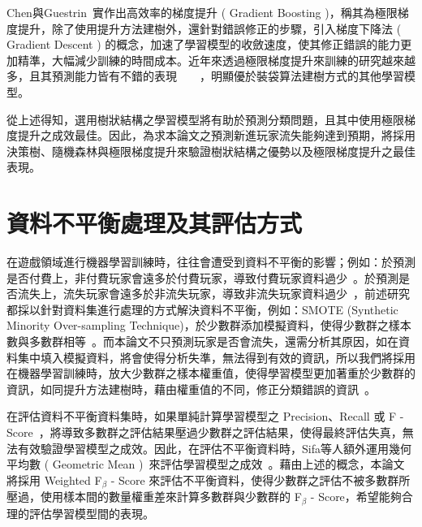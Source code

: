 Chen與Guestrin~\cite{chen2016xgboost}實作出高效率的梯度提升 ( Gradient Boosting )，稱其為極限梯度提升，除了使用提升方法建樹外，還針對錯誤修正的步驟，引入梯度下降法 ( Gradient Descent ) 的概念，加速了學習模型的收斂速度，使其修正錯誤的能力更加精準，大幅減少訓練的時間成本。近年來透過極限梯度提升來訓練的研究越來越多，且其預測能力皆有不錯的表現~\cite{XGBoostTemporalData}~\cite{martinez2020machine}~\cite{semenov2016performance}~\cite{janusz2017helping}，明顯優於裝袋算法建樹方式的其他學習模型。

從上述得知，選用樹狀結構之學習模型將有助於預測分類問題，且其中使用極限梯度提升之成效最佳。因此，為求本論文之預測新進玩家流失能夠達到預期，將採用決策樹、隨機森林與極限梯度提升來驗證樹狀結構之優勢以及極限梯度提升之最佳表現。

\section{資料不平衡處理及其評估方式}

在遊戲領域進行機器學習訓練時，往往會遭受到資料不平衡的影響；例如：於預測是否付費上，非付費玩家會遠多於付費玩家，導致付費玩家資料過少~\cite{sifa2015predicting}。於預測是否流失上，流失玩家會遠多於非流失玩家，導致非流失玩家資料過少~\cite{lee2016predicting}，前述研究都採以針對資料集進行處理的方式解決資料不平衡，例如：SMOTE (Synthetic Minority Over-sampling Technique)，於少數群添加模擬資料，使得少數群之樣本數與多數群相等~\cite{chawla2002smote}。而本論文不只預測玩家是否會流失，還需分析其原因，如在資料集中填入模擬資料，將會使得分析失準，無法得到有效的資訊，所以我們將採用在機器學習訓練時，放大少數群之樣本權重值，使得學習模型更加著重於少數群的資訊，如同提升方法建樹時，藉由權重值的不同，修正分類錯誤的資訊~\cite{freund1999short}。

在評估資料不平衡資料集時，如果單純計算學習模型之 Precision、Recall 或 F - Score~\cite{chinchor1993muc}，將導致多數群之評估結果壓過少數群之評估結果，使得最終評估失真，無法有效驗證學習模型之成效。因此，在評估不平衡資料時，Sifa等人額外運用幾何平均數 ( Geometric Mean )~\cite{kubat1997learning}來評估學習模型之成效~\cite{sifa2015predicting}。藉由上述的概念，本論文將採用 Weighted F$_{\beta}$ - Score 來評估不平衡資料，使得少數群之評估不被多數群所壓過，使用樣本間的數量權重差來計算多數群與少數群的 F$_{\beta}$ - Score，希望能夠合理的評估學習模型間的表現。